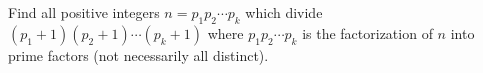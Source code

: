 Find all positive integers $n=p_1p_2 \cdots p_k$ which divide $(p_1+1)(p_2+1)\cdots (p_k+1)$ where $p_1 p_2 \cdots p_k$ is the factorization of $n$ into prime factors (not necessarily all distinct).